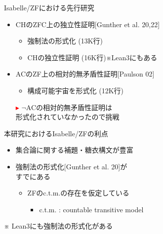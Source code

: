 \documentclass[17pt]{beamer}
\begin{document}


\begin{frame}{Isabelle/ZFにおける先行研究}
 
    {\small 
    \begin{itemize}[itemsep=8pt]
        \vspace{10pt}
        \item CHのZFC上の独立性証明{\small [Gunther et al. 20,22]}
            \vspace{3pt}
              {\small \begin{itemize}
                \item 強制法の形式化 (13K行)
                \item CHの独立性証明 (16K行)※Lean3にもある
              \end{itemize} }

        \item ACのZF上の相対的無矛盾性証明{\small [Paulson 02]}
              {\small \begin{itemize}
                      \item 構成可能宇宙を形式化 (12K行)
                  \end{itemize} }
    \end{itemize}
    \begin{itemize}
        \item [\textcolor{red}{$\blacktriangleright$}] $\neg$ACの相対的無矛盾性証明は\\
        形式化されていなかったので挑戦
    \end{itemize}
    }
\end{frame}

\begin{frame}{本研究におけるIsabelle/ZFの利点}
    \begin{itemize}
        \item 集合論に関する補題・糖衣構文が豊富
        \item 強制法の形式化{\small [Gunther et al. 20]}が\\すでにある
        {\small \begin{itemize}[itemsep=15pt]
            \vspace{10pt}
            \item ZFのc.t.m.の存在を仮定している
            \begin{itemize}
                \item c.t.m. : countable transitive model
            \end{itemize}
        \end{itemize}}
    \end{itemize}
    {\small 
    ※ Lean3にも強制法の形式化がある}
\end{frame}
\end{document}
